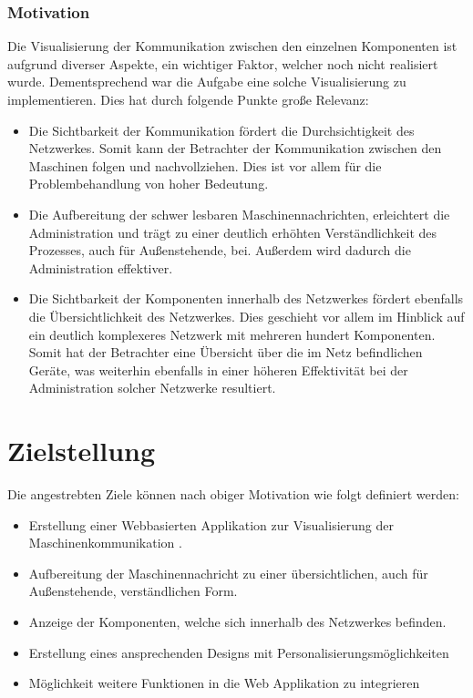 \documentclass[
	12pt,								%
	DIV10,
	a4paper,         		%
	oneside,						%
	parskip=half,				%
	headings=normal,			%
	listof=totoc,					%
	bibliography=totoc,						%
	index=totoc,						%
	final								%
]{scrartcl}
\begin{document}
\subsubsection*{Motivation}
Die Visualisierung der Kommunikation zwischen den einzelnen Komponenten ist aufgrund diverser Aspekte, ein wichtiger Faktor, welcher noch nicht realisiert wurde. Dementsprechend war die Aufgabe eine solche Visualisierung zu implementieren. Dies hat durch folgende Punkte große Relevanz: 
\begin{itemize}
\item Die Sichtbarkeit der Kommunikation fördert die Durchsichtigkeit des Netzwerkes. Somit kann der Betrachter der Kommunikation zwischen den Maschinen folgen und nachvollziehen. Dies ist vor allem für die Problembehandlung von hoher Bedeutung. 
\item Die Aufbereitung der schwer lesbaren Maschinennachrichten, erleichtert die Administration und trägt zu einer deutlich erhöhten Verständlichkeit des Prozesses, auch für Außenstehende, bei. Außerdem wird dadurch die Administration effektiver.
\item Die Sichtbarkeit der Komponenten innerhalb des Netzwerkes fördert ebenfalls die Übersichtlichkeit des Netzwerkes. Dies geschieht vor allem im Hinblick auf ein deutlich komplexeres Netzwerk mit mehreren hundert Komponenten. Somit hat der Betrachter eine Übersicht über die im Netz befindlichen Geräte, was weiterhin ebenfalls in einer höheren Effektivität bei der Administration solcher Netzwerke resultiert. 
\end{itemize}

\section{Zielstellung}
Die angestrebten Ziele können nach obiger Motivation wie folgt definiert werden:
\begin{itemize}
\item Erstellung einer Webbasierten Applikation zur Visualisierung der Maschinenkommunikation .
\item Aufbereitung der Maschinennachricht zu einer übersichtlichen, auch für Außenstehende, verständlichen Form.
\item Anzeige der Komponenten, welche sich innerhalb des Netzwerkes befinden.
\item Erstellung eines ansprechenden Designs mit Personalisierungsmöglichkeiten
\item Möglichkeit weitere Funktionen in die Web Applikation zu integrieren
\end{itemize}
\end{document}
